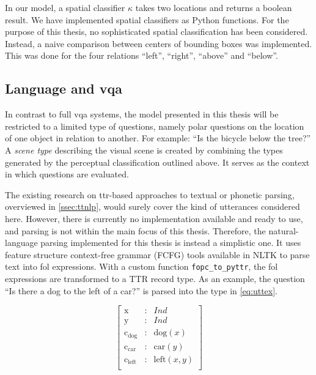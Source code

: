In our model, a spatial classifier $\kappa$ takes two locations and returns a boolean result.
We have implemented spatial classifiers as Python functions.
For the purpose of this thesis, no sophisticated spatial classification has been considered.
Instead, a naive comparison between centers of bounding boxes was implemented.
This was done for the four relations ``left'', ``right'', ``above'' and ``below''.



\subsection{Language and \gls{vqa}}
\label{ssec:languagevqa}

In contrast to full \gls{vqa} systems, the model presented in this thesis will be restricted to a limited type of questions, namely polar questions on the location of one object in relation to another.
For example: ``Is the bicycle below the tree?''
A \textit{scene type} describing the visual scene is created by combining the types generated by the perceptual classification outlined above.
It serves as the context in which questions are evaluated.

The existing research on \gls{ttr}-based approaches to textual or phonetic parsing, overviewed in \autoref{ssec:ttnlp}, would surely cover the kind of utterances considered here.
However, there is currently no implementation available and ready to use, and parsing is not within the main focus of this thesis.
Therefore, the natural-language parsing implemented for this thesis is instead a simplistic one.
It uses feature structure context-free grammar (FCFG) tools available in NLTK \cite{BirdNaturalLanguageProcessing2009} to parse text into \gls{fol} expressions.
With a custom function {\tt fopc\_to\_pyttr}, the \gls{fol} expressions are transformed to a TTR record type.
As an example, the question ``Is there a dog to the left of a car?'' is parsed into the type in \autoref{eq:uttex}.

\begin{equation}\label{eq:uttex}
\left[\begin{array}{rcl}
\text{x} &:& Ind\\
\text{y} &:& Ind\\
\text{c}_\text{dog} &:& \text{dog}(x)\\
\text{c}_\text{car} &:& \text{car}(y)\\
\text{c}_\text{left} &:& \text{left}(x, y)\\
\end{array}\right]\end{equation}

